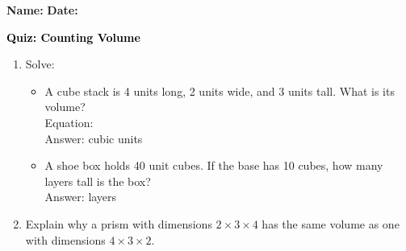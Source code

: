 \documentclass[12pt, letterpaper, fleqn]{article}
\newcommand{\blank}{\underline{\hspace{2.2cm}}}
\newcommand{\blanklong}{\underline{\hspace{6.5cm}}}
\begin{document}
\textbf{Name:} \underline{\hspace{5cm}}
\hfill
\textbf{Date:} \underline{\hspace{3cm}}\\

\begin{tcolorbox}[colback=customteal!20]
    \large\textcolor{black}{\textbf{Quiz: Counting Volume}}
\end{tcolorbox}

\vspace{5mm}
\begin{enumerate}[itemsep=3cm, leftmargin=0.6cm]
\item Solve:
  \begin{itemize}[itemsep=1.5cm]
    \item A cube stack is 4 units long, 2 units wide, and 3 units tall. What is its volume? \\ Equation: \blanklong \\ Answer: \blank cubic units
    \item A shoe box holds 40 unit cubes. If the base has 10 cubes, how many layers tall is the box? \\ Answer: \blank layers
  \end{itemize}

\item Explain why a prism with dimensions $2 \times 3 \times 4$ has the same volume as one with dimensions $4 \times 3 \times 2$.
\end{enumerate}
\end{document}
